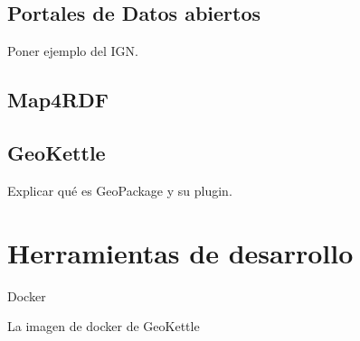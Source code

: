 \subsection{Portales de Datos abiertos} Poner ejemplo del IGN.

\subsection{Map4RDF}

\subsection{GeoKettle} Explicar qué es GeoPackage y su plugin.

\section{Herramientas de desarrollo} Docker

La imagen de docker de GeoKettle


